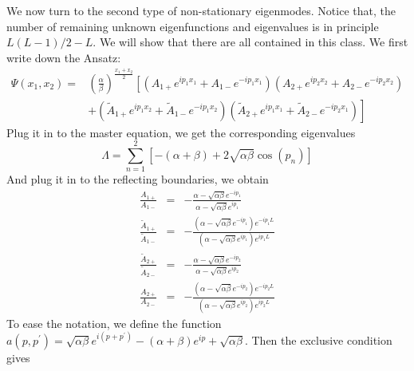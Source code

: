 We now turn to the second type of non-stationary eigenmodes. Notice that, the
number of remaining unknown eigenfunctions and eigenvalues is in principle
$L(L-1)/2 - L$. We will show that there are all contained in this class. We
first write down the Ansatz:
\begin{equation}
    \label{eq:nonstationaryModesTwo2}
    \begin{aligned}
        \Psi(x_1, x_2) = &  \left(\frac{\alpha}{\beta}\right)^{\frac{x_1+x_2}{2}} 
        \left[\left( A_{1+} e^{ip_1 x_1} + A_{1-} e^{-ip_1 x_1}\right)  
            \left( A_{2+} e^{ip_2 x_2} + A_{2-} e^{-ip_2 x_2}\right) \right.\\
        & \left. + \left( \tilde{A}_{1+} e^{ip_1 x_2} + \tilde{A}_{1-} e^{-ip_1
                    x_2}\right)  \left( \tilde{A}_{2+} e^{ip_1 x_1} +
                \tilde{A}_{2-} e^{-ip_2 x_1}\right) \right]
    \end{aligned}
\end{equation}
Plug it in to the master equation, we get the corresponding eigenvalues
\begin{equation}
    \label{eq:eigenvaluesTwo2}
    \Lambda = \sum_{n=1}^2\left[-(\alpha+\beta) + 
        2\sqrt{\alpha\beta}\cos(p_n)\right]
\end{equation} 
And plug it in to the reflecting boundaries, we obtain
\begin{subequations}
    \label{eq:scatterFactorBoundary2}
    \begin{align}
        \frac{A_{1+}}{A_{1-}} & = & -\frac{\alpha-\sqrt{\alpha\beta}
                e^{-ip_1}}{\alpha-\sqrt{\alpha\beta} e^{ip_1}}  \\
        \frac{\tilde{A}_{1+}}{\tilde{A}_{1-}} & = & 
        -\frac{\left(\alpha-\sqrt{\alpha\beta} e^{-ip_1}\right) e^{-ip_1L}}
        {\left(\alpha-\sqrt{\alpha\beta} e^{ip_1}\right) e^{ip_1L}}  \\
        \frac{\tilde{A}_{2+}}{\tilde{A}_{2-}} & = & -\frac{\alpha -
            \sqrt{\alpha\beta} e^{-ip_2}}{\alpha-\sqrt{\alpha\beta} e^{ip_2}}\\
        \frac{A_{2+}}{A_{2-}} & = & -\frac{\left(\alpha-\sqrt{\alpha\beta}
                e^{-ip_2}\right) e^{-ip_2L}}{\left(\alpha-\sqrt{\alpha\beta} 
                e^{ip_2}\right) e^{ip_2L}}
    \end{align}
\end{subequations}
To ease the notation, we define the function $a(p, p^\prime) =
\sqrt{\alpha\beta}e^{i(p+p^\prime)}-(\alpha+\beta)e^{ip}+\sqrt{\alpha\beta}$.
Then the exclusive condition gives 
